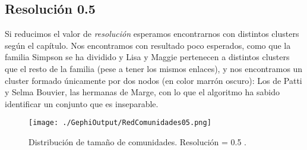\documentclass[11pt]{article}
\begin{document}
\subsection{Resolución 0.5}
\label{sec:orgf2fb671}

Si reducimos el valor de \emph{resolución} esperamos encontrarnos con
distintos clusters según el capítulo. Nos encontramos con resultado
poco esperados, como que la familia Simpson se ha dividido y Lisa
y Maggie pertenecen a distintos clusters que el resto de la familia
(pese a tener los mismos enlaces), y nos encontramos un cluster
formado únicamente por dos nodos (en color marrón oscuro): Los de Patti y Selma Bouvier, las
hermanas de Marge, con lo que el algoritmo ha sabido identificar un
conjunto que es inseparable. 

\begin{figure}[htbp]
\centering
\texttt{[image: ./GephiOutput/RedComunidades05.png]}
\caption{\label{fig:orgadcc2b2}
Distribución de tamaño de comunidades. Resolución = 0.5 .}
\end{figure}
\end{document}
